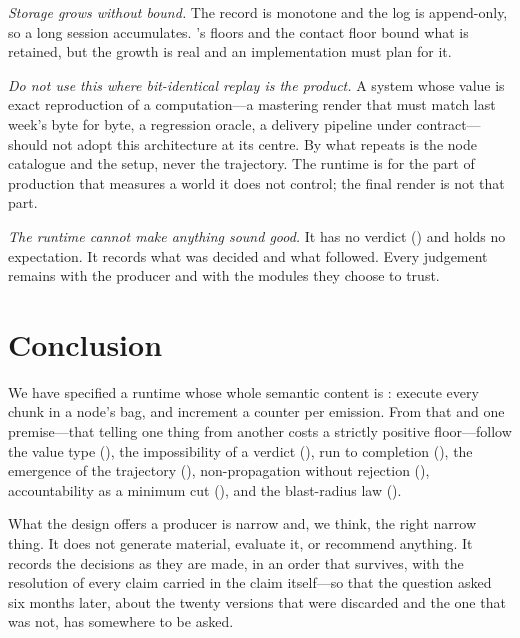 \documentclass[11pt,twocolumn,a4paper]{article}
\theoremstyle{definition}
\theoremstyle{remark}
\begin{document}
\emph{Storage grows without bound.} The record is monotone and the log is
append-only, so a long session accumulates. 's floors and
the contact floor bound what is retained, but the growth is real and an
implementation must plan for it.

\emph{Do not use this where bit-identical replay is the product.} A system whose
value is exact reproduction of a computation---a mastering render that must match
last week's byte for byte, a regression oracle, a delivery pipeline under
contract---should not adopt this architecture at its centre. By
 what repeats is the node catalogue and the setup, never the
trajectory. The runtime is for the part of production that measures a world it
does not control; the final render is not that part.

\emph{The runtime cannot make anything sound good.} It has no verdict
() and holds no expectation. It records what was decided and
what followed. Every judgement remains with the producer and with the modules
they choose to trust.

\section{Conclusion}
\label{sec:conclusion}

We have specified a runtime whose whole semantic content is
: execute every chunk in a node's bag, and increment a counter
per emission. From that and one premise---that telling one thing from another
costs a strictly positive floor---follow the value type
(), the impossibility of a verdict (), run to
completion (), the emergence of the trajectory
(), non-propagation without rejection (),
accountability as a minimum cut (), and the blast-radius law
().

What the design offers a producer is narrow and, we think, the right narrow
thing. It does not generate material, evaluate it, or recommend anything. It
records the decisions as they are made, in an order that survives, with the
resolution of every claim carried in the claim itself---so that the question
asked six months later, about the twenty versions that were discarded and the one
that was not, has somewhere to be asked.



\end{document}
